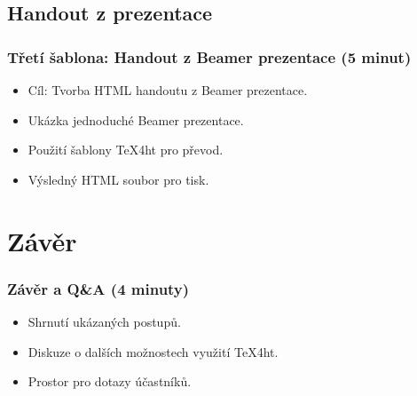 \documentclass{beamer}
\begin{document}
\subsection{Handout z prezentace}
\begin{frame}
\frametitle{Třetí šablona: Handout z Beamer prezentace (5 minut)}
\begin{itemize}
    \item Cíl: Tvorba HTML handoutu z Beamer prezentace.
    \item Ukázka jednoduché Beamer prezentace.
    \item Použití šablony TeX4ht pro převod.
    \item Výsledný HTML soubor pro tisk.
\end{itemize}
\end{frame}

\section{Závěr}

\begin{frame}
\frametitle{Závěr a Q\&A (4 minuty)}
\begin{itemize}
    \item Shrnutí ukázaných postupů.
    \item Diskuze o dalších možnostech využití TeX4ht.
    \item Prostor pro dotazy účastníků.
\end{itemize}
\end{frame}
\end{document}

